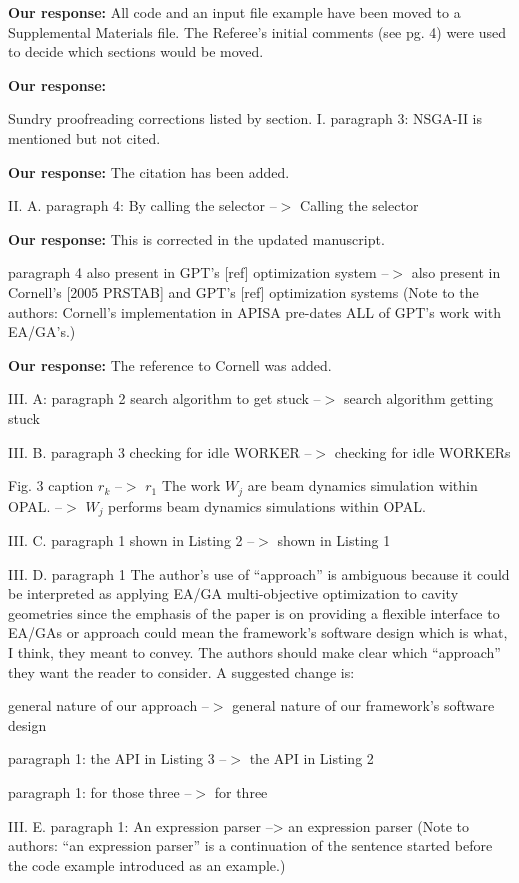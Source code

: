 \documentclass{article}
\begin{document}
{\bf Our response: } {\color{blue} All code and an input file example 
	have been moved to a Supplemental Materials file. 
	The Referee's initial comments (see pg. 4) were used to 
	decide which sections would be moved. }

{\bf Our response:} {\color{blue} }

Sundry proofreading corrections listed by section.
I. paragraph 3: NSGA-II is mentioned but not cited.

{\bf Our response:} {\color{blue} The citation has been added.}

II. A. paragraph 4: By calling the selector --$>$ Calling the selector

{\bf Our response:} {\color{blue} This is corrected in the updated manuscript.}

paragraph 4
also present in GPT's [ref] optimization system --$>$ also
present in Cornell's [2005 PRSTAB] and GPT's [ref] optimization systems
(Note to the authors: Cornell's implementation in APISA pre-dates ALL
of GPT's work with EA/GA's.)

{\bf Our response:} {\color{blue} The reference to Cornell was added.}

III. A: paragraph 2
search algorithm to get stuck --$>$ search algorithm getting
stuck

III. B. paragraph 3
checking for idle WORKER --$>$ checking for idle WORKERs

Fig. 3 caption
$r_k$ --$>$ $r_1$
The work $W_j$ are beam dynamics simulation within OPAL.
--$>$ $W_j$ performs beam dynamics simulations within OPAL.

III. C. paragraph 1
shown in Listing 2 --$>$ shown in Listing 1

III. D. paragraph 1
The author's use of ``approach'' is ambiguous because it could be
interpreted as applying EA/GA multi-objective optimization to cavity
geometries since the emphasis of the paper is on providing a flexible
interface to EA/GAs or approach could mean the framework's software
design which is what, I think, they meant to convey. The authors
should make clear which ``approach'' they want the reader to consider.
A suggested change is:

general nature of our approach --$>$ general nature of our
framework's software design

paragraph 1: the API in Listing 3 --$>$ the API in Listing 2

paragraph 1: for those three --$>$ for three

III. E. paragraph 1:
An expression parser --> an expression parser
(Note to authors: ``an expression parser'' is a continuation of the
sentence started before the code example introduced as an example.)
\end{document}
